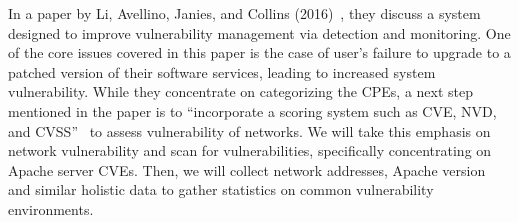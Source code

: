 In a paper by Li, Avellino, Janies, and Collins (2016)~\cite{li_avellino_janies_collins_2016}, they discuss a system designed to improve vulnerability management via detection and monitoring. One of the core issues covered in this paper is the case of user's failure to upgrade to a patched version of their software services, leading to increased system vulnerability. While they concentrate on categorizing the CPEs, a next step mentioned in the paper is to ``incorporate a scoring system such as CVE, NVD, and CVSS''~\cite{li_avellino_janies_collins_2016} to assess vulnerability of networks. We will take this emphasis on network vulnerability and scan for vulnerabilities, specifically concentrating on Apache server CVEs. Then, we will collect network addresses, Apache version and similar holistic data to gather statistics on common vulnerability environments.
